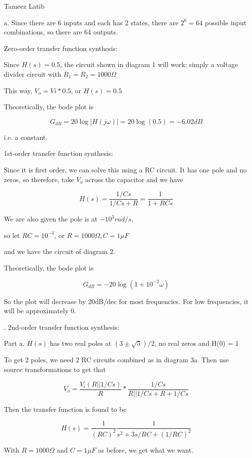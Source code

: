 \documentclass{article}
\begin{document}
Tameez Latib


a. Since there are 6 inputs and each has 2 states, there are $2^6 = 64$ possible input combinations, so there are 64 outputs.


 \vspace{10cm}



Zero-order transfer function synthesis:

Since $H(s) = 0.5$, the circuit shown in diagram 1 will work; simply a voltage divider circuit with $R_1 = R_2 = 1000\Omega$

This way, $V_{o}= V{i}*0.5$, or $H(s) = 0.5$

Theoretically, the bode plot is

 $$G_{dB} = 20 \log |H(j\omega)| =  20 \log (0.5) = -6.02dB$$
 
 i.e. a constant.
 
1st-order transfer function synthesis:

Since it is first order, we can solve this using a RC circuit. It has one pole and no zeros, so therefore, take $V_{o}$ across the capacitor and we have

$$H(s) = \frac{1/Cs}{1/Cs+R} = \frac{1}{1+RCs}$$

We are also given the pole is at $-10^{3} rad/s$, 

so let $ RC = 10^{-3}$, or $R = 1000 \Omega,  C = 1 \mu F$

and we have the circuit of diagram 2.

Theoretically, the bode plot is

 $$G_{dB} = - 20 \log ({1+10^{-3}\omega}) $$
  
So the plot will decrease by 20dB/dec for most frequencies. For low frequencies, it will be approximately 0.
 
 .
 2nd-order transfer function synthesis:
 
Part a. $ H(s)$ has two real poles at $(3 \pm \sqrt{5} )/2$, no real zeros and H(0) = 1

To get 2 poles, we need 2 RC circuits combined as in diagram 3a. Then use source transformations to get that 

$$V_o = \frac{V_i(R||1/Cs)}{R}  * \frac{1/Cs}{R||1/Cs+R+1/Cs}$$
 
 Then the transfer function is found to be
 
 $$H(s) = \frac{1}{{(RC)}^2} \frac{1}{s^2 + 3s/RC + (1/RC)^2}$$
 
 With $R = 1000\Omega$ and $C = 1 \mu F$ as before, we get what we want. 
\end{document}
